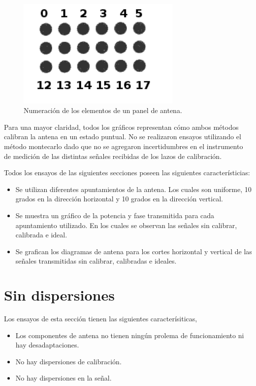 \begin{figure}[H]
 \centering
 \includegraphics[width=8cm]{gfx/arrayNumeration.png}
 \caption{Numeración de los elementos de un panel de antena.}
 \label{fig:doubleBuilder}
\end{figure}

Para una mayor claridad, todos los gráficos representan cómo ambos métodos calibran la antena en un estado puntual. No se 
realizaron ensayos utilizando el método montecarlo dado que no se agregaron incertidumbres en el instrumento de medición de las 
distintas señales recibidas de los lazos de calibración.

Todos los ensayos de las siguientes secciones poseen las siguientes característicias:
\begin{itemize}
	\item Se utilizan diferentes apuntamientos de la antena. Los cuales son uniforme, 10 grados en la dirección horizontal y 10 
		grados en la dirección vertical.
	\item Se muestra un gráfico de la potencia y fase transmitida para cada apuntamiento utilizado. En los cuales se observan las
		señales sin calibrar, calibrada e ideal. 
	\item Se grafican los diagramas de antena para los cortes horizontal y vertical de las señales transmitidas sin calibrar, 
		calibradas e ideales.
\end{itemize}


\section{Sin dispersiones}

Los ensayos de esta sección tienen las siguientes caracterísiticas,
\begin{itemize}
	\item Los componentes de antena no tienen ningún prolema de funcionamiento ni hay desadaptaciones.
	\item No hay dispersiones de calibración.
	\item No hay dispersiones en la señal.
\end{itemize}

